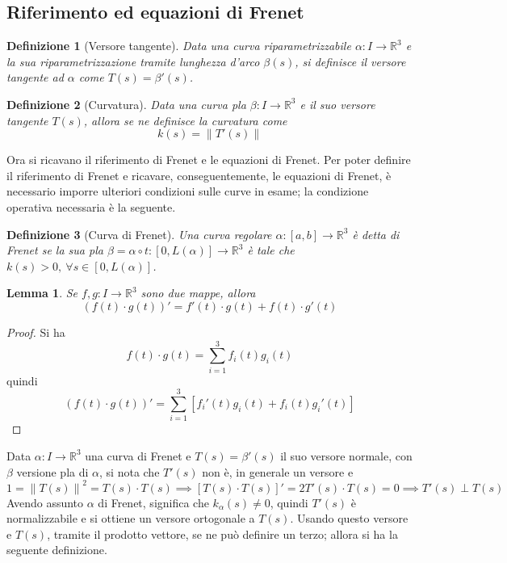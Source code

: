 \documentclass[12pt]{scrartcl}
\theoremstyle{style}
\newtheorem{definizione}{Definizione}[section]
\newtheorem{lemma}{Lemma}[teorema]
\numberwithin{equation}{subsection}
\begin{document}
\subsection{Riferimento ed equazioni di Frenet}
\begin{definizione}
	[Versore tangente]
	Data una curva riparametrizzabile $\alpha :I \to \mathbb{R}^3$ e la sua riparametrizzazione tramite lunghezza d'arco $\beta (s)$, si definisce il \textit{versore tangente} ad $\alpha $ come $T(s) = \beta '(s)$.
\end{definizione}
\begin{definizione}
	[Curvatura]
	Data una curva pla $\beta :I\to \mathbb{R}^3$ e il suo versore tangente $T(s)$, allora se ne definisce la \textit{curvatura} come
	\[
	k (s) = \left\lVert T'(s) \right\rVert 
	\] 
\end{definizione}
\noindent Ora si ricavano il riferimento di Frenet e le equazioni di Frenet.
Per poter definire il riferimento di Frenet e ricavare, conseguentemente, le equazioni di Frenet, \`e necessario imporre ulteriori condizioni sulle curve in esame; la condizione operativa necessaria \`e la seguente.
\begin{definizione}
	[Curva di Frenet]
	Una curva regolare $\alpha:[a,b]\to\mathbb{R}^3 $ \`e detta \textit{di Frenet} se la sua pla $\beta = \alpha  \circ t:[0,L(\alpha )]\to \mathbb{R}^3$ \`e tale che $k(s) >0, \ \forall s \in [0,L(\alpha )]$.
\end{definizione}
\begin{lemma}\label{lemdif}
	Se $f, g : I \to \mathbb{R}^{3} $ sono due mappe, allora 
	\[
	\left(f(t)\cdot g(t)\right) ' = f'(t) \cdot g(t) + f(t) \cdot g'(t)
	\] 
\end{lemma}
	\begin{proof}
		Si ha
		\[
		f(t) \cdot g(t) = \sum_{i=1}^{3} f_i(t) g_i(t)
		\] 
	quindi
	\[
	\left(f(t)\cdot g(t)\right) ' = \sum_{i=1}^{3} \left[ f_i'(t)g_i(t) + f_i(t) g_i'(t) \right] 
	\] 
	\end{proof}
\noindent Data $\alpha : I \to \mathbb{R}^3$ una curva di Frenet e $T(s) = \beta '(s)	$ il suo versore normale, con $\beta $ versione pla di $\alpha $, si nota che $T'(s)$ non \`e, in generale un versore e 
\[
1 = \left\lVert T(s) \right\rVert ^2 = T(s) \cdot T(s) \implies \left[ T(s) \cdot T(s) \right] ' = 2T'(s) \cdot T(s) = 0 \implies T'(s) \perp T(s) 
\] 
Avendo assunto $\alpha $ di Frenet, significa che $k_\alpha  (s) \neq 0$, quindi $T'(s)$ \`e normalizzabile e si ottiene un versore ortogonale a $T(s)$.
Usando questo versore e $T(s)$, tramite il prodotto vettore, se ne pu\`o definire un terzo; allora si ha la seguente definizione.
\end{document}
